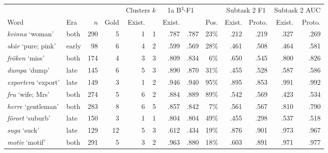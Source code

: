 \begin{tabular}{@{}llrrrrrrrrrrr@{}}
\toprule
 & & & & \multicolumn{2}{c}{Clusters $k$} & \multicolumn{2}{c}{1a B$^3$-F1} & & \multicolumn{2}{c}{Subtask 2 F1} & \multicolumn{2}{c}{Subtask 2 AUC} \\
\cmidrule(lr){5-6}\cmidrule(lr){7-8}\cmidrule(lr){10-11}\cmidrule(l){12-13}
Word & Era & $n$ & Gold & Exist. & \sys{} & Exist. & \sys{} & Pos. & Exist. & Proto. & Exist. & Proto. \\
\midrule
\emph{kvinna} `woman' & both & 290 & 5 & 1 & 1 & .787 & .787 & 23\% & .212 & .219 & .327 & .269 \\
\emph{skär} `pure; pink' & early & 98 & 6 & 4 & 2 & .599 & .569 & 28\% & .461 & .508 & .464 & .581 \\
\emph{fröken} `miss' & both & 174 & 4 & 3 & 3 & .809 & .834 & 6\% & .650 & .545 & .800 & .826 \\
\emph{dumpa} `dump' & late & 145 & 6 & 5 & 3 & .890 & .870 & 31\% & .455 & .528 & .587 & .586 \\
\emph{exportera} `export' & late & 149 & 3 & 1 & 2 & .946 & .940 & 95\% & .895 & .853 & .991 & .992 \\
\emph{fru} `wife; Mrs' & both & 274 & 5 & 6 & 2 & .884 & .889 & 89\% & .542 & .569 & .423 & .534 \\
\emph{herre} `gentleman' & both & 283 & 8 & 6 & 5 & .857 & .842 & 7\% & .561 & .567 & .810 & .790 \\
\emph{förort} `suburb' & late & 150 & 3 & 1 & 1 & .804 & .804 & 49\% & .455 & .298 & .537 & .518 \\
\emph{suga} `suck' & late & 129 & 12 & 5 & 3 & .612 & .434 & 19\% & .876 & .901 & .973 & .967 \\
\emph{motiv} `motif' & both & 291 & 5 & 3 & 2 & .963 & .880 & 18\% & .603 & .891 & .971 & .977 \\
\bottomrule
\end{tabular}
